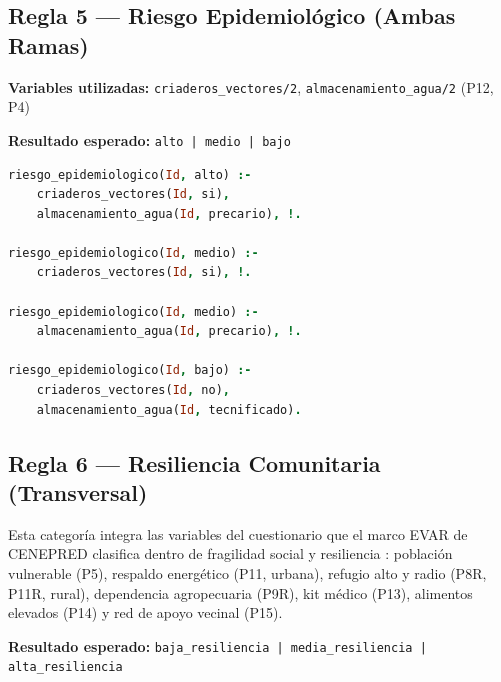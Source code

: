 \documentclass[12pt, letterpaper]{article}
\begin{document}
\subsection{Regla 5 — Riesgo Epidemiológico (Ambas Ramas)}

\textbf{Variables utilizadas:} \texttt{criaderos\_vectores/2}, \texttt{almacenamiento\_agua/2} (P12, P4)

\textbf{Resultado esperado:} \texttt{alto | medio | bajo}

\begin{lstlisting}[language=Prolog, caption={Reglas de riesgo epidemiológico}]
riesgo_epidemiologico(Id, alto) :-
    criaderos_vectores(Id, si),
    almacenamiento_agua(Id, precario), !.

riesgo_epidemiologico(Id, medio) :-
    criaderos_vectores(Id, si), !.

riesgo_epidemiologico(Id, medio) :-
    almacenamiento_agua(Id, precario), !.

riesgo_epidemiologico(Id, bajo) :-
    criaderos_vectores(Id, no),
    almacenamiento_agua(Id, tecnificado).
\end{lstlisting}

\subsection{Regla 6 — Resiliencia Comunitaria (Transversal)}

Esta categoría integra las variables del cuestionario que el marco EVAR de CENEPRED clasifica dentro de fragilidad social y resiliencia \parencite{cenepred_manual_evar}: población vulnerable (P5), respaldo energético (P11, urbana), refugio alto y radio (P8R, P11R, rural), dependencia agropecuaria (P9R), kit médico (P13), alimentos elevados (P14) y red de apoyo vecinal (P15).

\textbf{Resultado esperado:} \texttt{baja\_resiliencia | media\_resiliencia | alta\_resiliencia}
\end{document}
